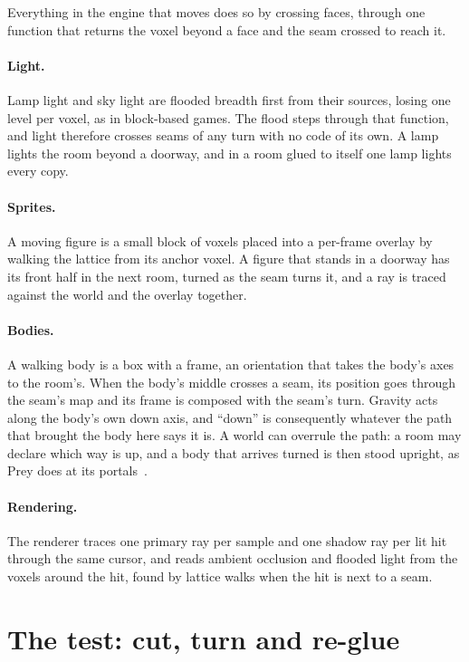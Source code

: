 \documentclass[10pt,a4paper]{article}
\begin{document}
Everything in the engine that moves does so by crossing faces, through one function that
returns the voxel beyond a face and the seam crossed to reach it.

\paragraph{Light.} Lamp light and sky light are flooded breadth first from their sources, losing
one level per voxel, as in block-based games. The flood steps through that function, and light
therefore crosses seams of any turn with no code of its own. A lamp lights the room beyond a
doorway, and in a room glued to itself one lamp lights every copy.

\paragraph{Sprites.} A moving figure is a small block of voxels placed into a per-frame overlay
by walking the lattice from its anchor voxel. A figure that stands in a doorway has its front
half in the next room, turned as the seam turns it, and a ray is traced against the world and
the overlay together.

\paragraph{Bodies.} A walking body is a box with a frame, an orientation that takes the body's
axes to the room's. When the body's middle crosses a seam, its position goes through the seam's
map and its frame is composed with the seam's turn. Gravity acts along the body's own down
axis, and ``down'' is consequently whatever the path that brought the body here says it is. A
world can overrule the path: a room may declare which way is up, and a body that arrives turned
is then stood upright, as Prey does at its portals~\cite{prey}.

\paragraph{Rendering.} The renderer traces one primary ray per sample and one shadow ray per lit
hit through the same cursor, and reads ambient occlusion and flooded light from the voxels
around the hit, found by lattice walks when the hit is next to a seam.

\section{The test: cut, turn and re-glue}
\label{sec:test}
\end{document}
